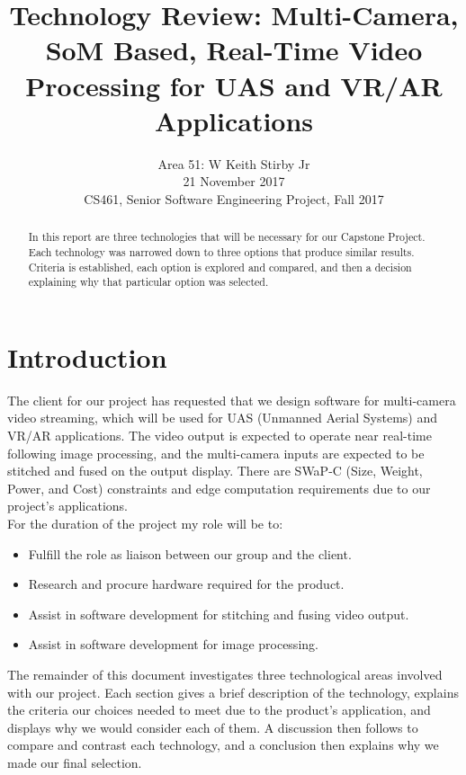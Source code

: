 \documentclass[letterpaper,10pt,serif,draftclsnofoot,onecolumn,compsoc,titlepage]{IEEEtran}
\title{Technology Review: Multi-Camera, SoM Based, Real-Time Video Processing for UAS and VR/AR Applications}
\author{Area 51: W Keith Stirby Jr \\ 21 November 2017 \\ CS461, Senior Software Engineering Project, Fall 2017}
\begin{document}
\begin{titlepage}
\maketitle
\begin{abstract}

In this report are three technologies that will be necessary for our Capstone Project. 
Each technology was narrowed down to three options that produce similar 
results. Criteria is established, each option is explored and compared, and then 
a decision explaining why that particular option was selected. \\

\thispagestyle{empty}
\end{abstract}
\end{titlepage}
\newpage
\tableofcontents
\newpage

\section{Introduction}

The client for our project has requested that we design software for multi-camera video 
streaming, which will be used for UAS (Unmanned Aerial Systems) and VR/AR applications. 
The video output is expected to operate near real-time following image processing, and the multi-camera inputs are 
expected to be stitched and fused on the output display. There are SWaP-C (Size, Weight, Power,
and Cost) constraints and edge computation requirements due to our project's applications. \\

For the duration of the project my role will be to:
\begin{itemize}
	\itemsep-2em
	\item Fulfill the role as liaison between our group and the client. \\
	\item Research and procure hardware required for the product. \\
	\item Assist in software development for stitching and fusing video output. \\
	\item Assist in software development for image processing. \\
\end{itemize}

The remainder of this document investigates three technological areas involved with 
our project. Each section gives a brief description of the technology, explains the 
criteria our choices needed to meet due to the product's application, and displays why 
we would consider each of them. A discussion then follows to compare and contrast each 
technology, and a conclusion then explains why we made our final selection.\\
\end{document}
